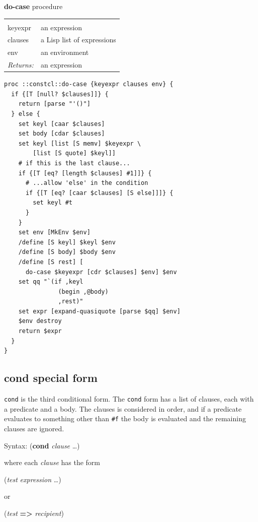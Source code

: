 \documentclass[twoside]{report}
\begin{document}
\textbf{do-case} procedure

\noindent\begin{tabular}{ |p{1.9cm} p{8cm}| }
\hline
\rowcolor[HTML]{CCCCCC} \multicolumn{2}{|l|}{\bf do-case (internal)} \\
keyexpr & an expression \\
clauses & a Lisp list of expressions \\
env & an environment \\
\textit{Returns:} & an expression \\
\hline
\end{tabular}

\begin{lstlisting}
proc ::constcl::do-case {keyexpr clauses env} {
  if {[T [null? $clauses]]} {
    return [parse "'()"]
  } else {
    set keyl [caar $clauses]
    set body [cdar $clauses]
    set keyl [list [S memv] $keyexpr \
        [list [S quote] $keyl]]
    # if this is the last clause...
    if {[T [eq? [length $clauses] #1]]} {
      # ...allow 'else' in the condition
      if {[T [eq? [caar $clauses] [S else]]]} {
        set keyl #t
      }
    }
    set env [MkEnv $env]
    /define [S keyl] $keyl $env
    /define [S body] $body $env
    /define [S rest] [
      do-case $keyexpr [cdr $clauses] $env] $env
    set qq "`(if ,keyl
               (begin ,@body)
               ,rest)"
    set expr [expand-quasiquote [parse $qq] $env]
    $env destroy
    return $expr
  }
}
\end{lstlisting}

\subsection{cond special form}
\label{cond-special-form}

\texttt{cond} is the third conditional form. The \texttt{cond} form has a list of clauses, each with a predicate and a body. The clauses is considered in order, and if a predicate evaluates to something other than \texttt{\#f} the body is evaluated and the remaining clauses are ignored.

Syntax: (\textbf{cond} \emph{clause} \ldots )

where each \emph{clause} has the form

(\emph{test} \emph{expression} \ldots )

or

(\emph{test} \textbf{=>} \emph{recipient})
\end{document}
